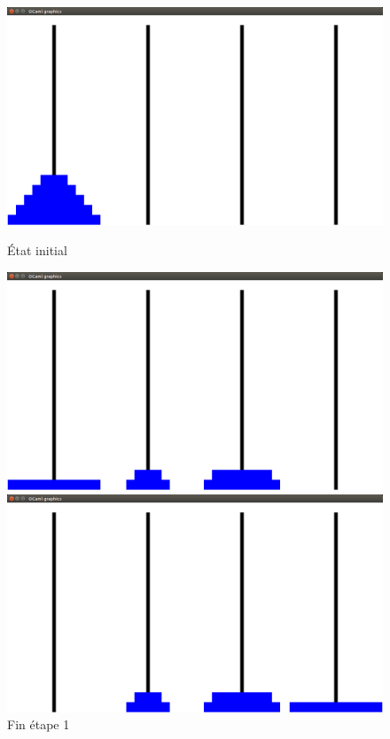 \documentclass[a4paper, 11pt]{article}%
\begin{document}
		\begin{figure}[!h]
			  \includegraphics[width=\linewidth]{hanoi_gen_start.png}
			  \caption{État initial}\label{fig:hanoi_gen_start}
			\endminipage\hfill
			  \includegraphics[width=\linewidth]{hanoi_gen_mid1.png}
			  \caption{Fin étape 1}\label{fig:hanoi_gen_mid1}
			\endminipage\hfill
			  \includegraphics[width=\linewidth]{hanoi_gen_mid2.png}

\end{figure}
\end{document}
